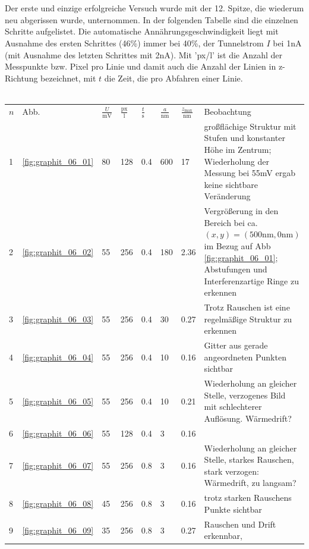\\\\
Der erste und einzige erfolgreiche Versuch wurde mit der 12. Spitze, die wiederum neu 
abgerissen wurde, unternommen. In der folgenden Tabelle sind die einzelnen Schritte 
aufgelistet. Die automatische Annährungsgeschwindigkeit liegt mit Ausnahme des ersten 
Schrittes (46\%) immer bei 40\%, der Tunnelstrom $I$ bei 1nA (mit Ausnahme des letzten 
Schrittes mit 2nA). Mit 'px/l' ist die Anzahl der Messpunkte bzw. Pixel pro Linie und 
damit auch die Anzahl der Linien in z-Richtung bezeichnet, mit $t$ die Zeit, die pro 
Abfahren einer Linie. 
\\\\
\begin{tabular}{p{3pt} p{12pt} p{9pt} p{9pt} p{9pt} p{12pt} p{14pt} p{9cm}}
$n$ & Abb.      & $\frac{U}{\mathrm{mV}}$ & $\frac{\mathrm{px}}{\mathrm{l}}$ & 
    $\frac{t}{\mathrm{s}}$ & $\frac{a}{\mathrm{nm}} $ & 
    $\frac{z_{\mathrm{max}}}{\mathrm{nm}}$ & Beobachtung \\
1   & \ref{fig:graphit_06_01}& 80 & 128 & 0.4 & 600 & 17 & großflächige Struktur mit 
Stufen und konstanter Höhe im Zentrum; Wiederholung der Messung bei 55mV ergab keine 
sichtbare Veränderung \\
2   & \ref{fig:graphit_06_02}& 55 & 256 & 0.4 & 180 & 2.36 & Vergrößerung in den Bereich bei 
ca. $(x, y) = (500\mathrm{nm}, 0\mathrm{nm})$ im Bezug auf Abb \ref{fig:graphit_06_01}; 
Abstufungen und Interferenzartige Ringe zu erkennen \\
3   & \ref{fig:graphit_06_03}& 55 & 256 & 0.4 &  30 & 0.27 & Trotz Rauschen ist eine 
regelmäßige Struktur zu erkennen \\
4   & \ref{fig:graphit_06_04}& 55 & 256 & 0.4 &  10 & 0.16 & Gitter aus gerade angeordneten 
Punkten sichtbar\\
5   & \ref{fig:graphit_06_05}& 55 & 256 & 0.4 &  10 & 0.21 & Wiederholung an gleicher Stelle, 
verzogenes Bild mit schlechterer Auflösung. Wärmedrift?\\
6   & \ref{fig:graphit_06_06}& 55 & 128 & 0.4 &   3 & 0.16 & \\
7   & \ref{fig:graphit_06_07}& 55 & 256 & 0.8 &   3 & 0.16 & Wiederholung an gleicher Stelle, 
starkes Rauschen, stark verzogen: Wärmedrift, zu langsam?\\
8   & \ref{fig:graphit_06_08}& 45 & 256 & 0.8 &   3 & 0.16 & trotz starken Rauschens Punkte 
sichtbar \\
9  & \ref{fig:graphit_06_09}& 35 & 256 & 0.8 &   3 & 0.27 & Rauschen und Drift erkennbar, 

\end{tabular}

